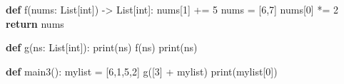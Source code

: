 \documentclass[]{article}
\newenvironment{Shaded}{}{}
\newcommand{\KeywordTok}[1]{\textcolor[rgb]{0.00,0.44,0.13}{\textbf{#1}}}
\newcommand{\DecValTok}[1]{\textcolor[rgb]{0.25,0.63,0.44}{#1}}
\newcommand{\ControlFlowTok}[1]{\textcolor[rgb]{0.00,0.44,0.13}{\textbf{#1}}}
\newcommand{\OperatorTok}[1]{\textcolor[rgb]{0.40,0.40,0.40}{#1}}
\newcommand{\BuiltInTok}[1]{#1}
\newcommand{\NormalTok}[1]{#1}
\begin{document}
\begin{enumerate}
\begin{Shaded}
\begin{Highlighting}[]
\KeywordTok{def}\NormalTok{ f(nums: List[}\BuiltInTok{int}\NormalTok{]) }\OperatorTok{->}\NormalTok{ List[}\BuiltInTok{int}\NormalTok{]:}
\NormalTok{    nums[}\DecValTok{1}\NormalTok{] }\OperatorTok{+=} \DecValTok{5}
\NormalTok{    nums }\OperatorTok{=}\NormalTok{ [}\DecValTok{6}\NormalTok{,}\DecValTok{7}\NormalTok{]}
\NormalTok{    nums[}\DecValTok{0}\NormalTok{] }\OperatorTok{*=} \DecValTok{2}
    \ControlFlowTok{return}\NormalTok{ nums}

\KeywordTok{def}\NormalTok{ g(ns: List[}\BuiltInTok{int}\NormalTok{]):}
    \BuiltInTok{print}\NormalTok{(ns)}
\NormalTok{    f(ns)}
    \BuiltInTok{print}\NormalTok{(ns)}

\KeywordTok{def}\NormalTok{ main3():}
\NormalTok{    mylist }\OperatorTok{=}\NormalTok{ [}\DecValTok{6}\NormalTok{,}\DecValTok{1}\NormalTok{,}\DecValTok{5}\NormalTok{,}\DecValTok{2}\NormalTok{]}
\NormalTok{    g([}\DecValTok{3}\NormalTok{] }\OperatorTok{+}\NormalTok{ mylist)}
    \BuiltInTok{print}\NormalTok{(mylist[}\DecValTok{0}\NormalTok{])}
\end{Highlighting}
\end{Shaded}
\end{enumerate}
\end{document}
